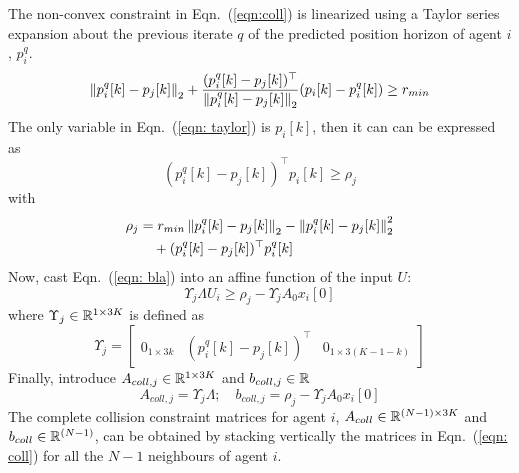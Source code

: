 The non-convex constraint in Eqn.~(\ref{eqn:coll}) is linearized using a Taylor series expansion about the previous iterate $q$ of the predicted position horizon of agent $i$, $p_i^q$.
\begin{equation}
\label{eqn: taylor}
\left\Vert p^q_i[k] - p_j[k]\right\Vert_2 + \frac{(p_i^q[k]-p_j[k])^\top}{\left\Vert p^q_i[k] - p_j[k]\right\Vert_2}(p_i[k]-p_i^q[k]) \geq r_{min}
\end{equation}
The only variable in Eqn.~(\ref{eqn: taylor}) is $p_i[k]$, then it can can be expressed as
\begin{equation}
\label{eqn: bla}
(p_i^q[k]-p_j[k])^\top p_i[k] \geq \rho_j
\end{equation}
with
\begin{equation}
\begin{aligned}
\rho_j &= r_{min}\left\Vert p^q_i[k] - p_j[k]\right\Vert_2 - \left\Vert p^q_i[k] - p_j[k]\right\Vert_2^2 \\
& \hspace{1em}+ (p_i^q[k]-p_j[k])^\top p^q_i[k]
\end{aligned}
\end{equation}
Now, cast Eqn.~(\ref{eqn: bla}) into an affine function of the input $U$:
\begin{equation}
\Upsilon_j \Lambda U_i \geq \rho_j - \Upsilon_j A_0 x_i[0]
\end{equation}
where $\Upsilon_j \in {\mathbb R}^{1 \times 3K}$ is defined as
\begin{equation}
\Upsilon_j = \begin{bmatrix}
0_{1\times 3k} & (p_i^q[k]-p_j[k])^\top & 0_{1 \times 3(K-1-k)}
\end{bmatrix}
\end{equation}
Finally, introduce $A_{coll,j} \in {\mathbb R}^{1 \times 3K}$ and $b_{coll,j} \in {\mathbb R}$
\begin{equation}
\label{eqn: coll}
A_{coll,j} = \Upsilon_j \Lambda ; \quad b_{coll,j} = \rho_j - \Upsilon_j A_0 x_i[0]
\end{equation}
The complete collision constraint matrices for agent $i$, $A_{coll} \in {\mathbb R}^{(N-1) \times 3K}$ and $b_{coll} \in {\mathbb R}^{(N-1)}$, can be obtained by stacking vertically the matrices in Eqn.~(\ref{eqn: coll}) for all the $N-1$ neighbours of agent $i$.


